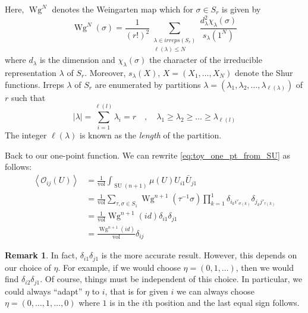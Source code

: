 \documentclass[a4paper,11pt]{article}
\theoremstyle{definition}
\newtheorem{remark}{Remark}
\DeclareMathOperator{\SU}{SU}
\DeclareMathOperator{\vol}{vol}
\DeclareMathOperator{\Wg}{Wg}
\newcommand{\OO}{\mathcal O}
\begin{document}
Here, $\Wg^N$ denotes the Weingarten map which for $\sigma \in S_r$ is given by
\begin{equation}
  \Wg^{N}(\sigma) = \frac{1}{(r!)^2} \sum_{\substack{\lambda \in irreps(S_r) \\ \ell(\lambda) \leq N}} \frac{d^2_{\lambda}\chi_{\lambda}(\sigma)}{s_{\lambda}(1^N)}
\end{equation}
where $d_{\lambda}$ is the dimension and $\chi_{\lambda}(\sigma)$ the character of the irreducible representation $\lambda$ of $S_r$.
Moreover, $s_{\lambda}(X)$, $X = (X_1,\dots,X_N)$ denote the Shur functions.
Irreps $\lambda$ of $S_r$ are enumerated by partitions $\lambda = (\lambda_1,\lambda_2,\dots,\lambda_{\ell(\lambda)})$ of $r$ such that 
\begin{equation}
  \lvert\lambda\rvert = \sum_{i=1}^{\ell(l)} \lambda_i = r \quad , \quad \lambda_1 \geq \lambda_2 \geq \dots \geq \lambda_{\ell(l)}
\end{equation}
The integer $\ell(\lambda)$ is known as the \emph{length} of the partition.

Back to our one-point function.
We can rewrite \eqref{eq:toy_one_pt_from_SU} as follows:
\begin{equation}
  \begin{split} 
    \left\langle \OO_{ij}(U) \right\rangle &= \frac{1}{\vol} \int_{\SU(n+1)}\mu(U) U_{i1}\bar U_{j1} \\
    &= \frac{1}{\vol} \sum_{\tau,\sigma \in S_1} \Wg^{n+1}(\tau^{-1}\sigma) \prod_{k = 1}^1 \delta_{i_k i'_{\sigma(k)}}\delta_{j_k j'_{\tau(k)}} \\
    &= \frac{1}{\vol} \Wg^{n+1}(id) \delta_{i1}\delta_{j1}\\
    &= \frac{\Wg^{n+1}(id)}{\vol} \delta_{ij}
  \end{split}
\end{equation}
\begin{remark}\label{rmk:important!}
  In fact, $\delta_{i1}\delta_{j1}$ is the more accurate result. 
  However, this depends on our choice of $\eta$. 
  For example, if we would choose $\eta = (0,1,\dots)$, then we would find $\delta_{i2}\delta_{j1}$.
  Of course, things must be independent of this choice.
  In particular, we could always ``adapt'' $\eta$ to $i$, that is for given $i$ we can always choose $\eta = (0,\dots,1,\dots,0)$ where $1$ is in the $i$th position and the last equal sign follows.
\end{remark}
\end{document}
